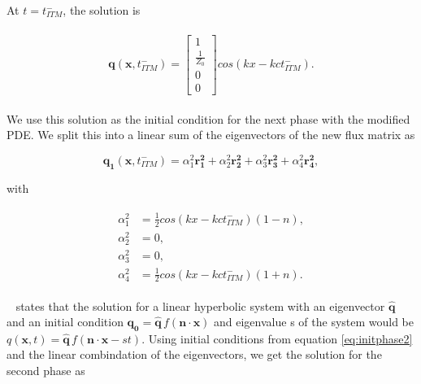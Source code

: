 At $t = t_{ITM}^-$, the solution is 

\begin{align}
    \begin{split}
        \mathbf{q}\left(\mathbf{x}, t_{ITM}^-\right) = \begin{bmatrix}
            1 \\
            \frac{1}{Z_0} \\
            0 \\
            0
            \end{bmatrix} cos\left(kx - k c t_{ITM}^-\right) .
    \end{split}
    \label{eq:initphase2}
\end{align}

We use this solution as the initial condition for the next phase with the modified PDE. We split this into a linear sum of the eigenvectors of the new flux matrix
as 

\begin{equation}
    \mathbf{q_1}\left(\mathbf{x}, t_{ITM}^-\right) = \alpha_1^2 \mathbf{r_1^2} + \alpha_2^2 \mathbf{r_2^2} + \alpha_3^2 \mathbf{r_3^2} + \alpha_4^2 \mathbf{r_4^2},
    \label{eq:linearsum}
\end{equation}

with 

\begin{align}
    \begin{split}
        \alpha_1^2 &= \frac{1}{2}cos\left(kx - k c t_{ITM}^-\right) \left(1 - n\right), \\
        \alpha_2^2 &= 0, \\
        \alpha_3^2 &= 0, \\
        \alpha_4^2 &= \frac{1}{2}cos\left(kx - k c t_{ITM}^-\right) \left(1 + n\right) .
    \end{split}
\end{align}

~\parencite[Sec 18.5]{leveque_2002} states that the solution for a linear hyperbolic system with an eigenvector $\mathbf{\hat{q}}$ and an initial condition $\mathbf{q_0} = \mathbf{\hat{q}} \, f\left(\mathbf{n} \cdot \mathbf{x}\right)$
and eigenvalue s of the system would be $q\left(\mathbf{x}, t\right) = \mathbf{\hat{q}} \, f\left( \mathbf{n} \cdot \mathbf{x} - s t\right)$. 
Using initial conditions from equation \ref{eq:initphase2} and the linear combindation of the eigenvectors, we get the solution for the second phase as

